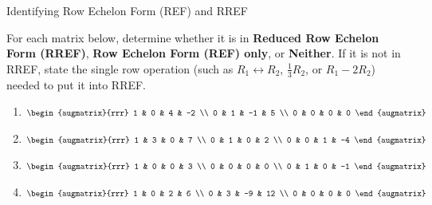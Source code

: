 \documentclass{article}
\begin{document}
\vspace{6pt}
\begin{activity} Identifying Row Echelon Form (REF) and RREF

For each matrix below, determine whether it is in \textbf{Reduced Row Echelon Form (RREF)}, \textbf{Row Echelon Form (REF) only}, or \textbf{Neither}. If it is not in RREF, state the single row operation (such as \(R_1 \leftrightarrow R_2\), \(\frac{1}{3}R_2\), or \(R_1 - 2R_2\)) needed to put it into RREF.
\begin{enumerate}
  \item \(\begin{augmatrix}{rrr}
    1 & 0 & 4 & -2 \\
    0 & 1 & -1 & 5 \\
    0 & 0 & 0 & 0
  \end{augmatrix}\)
  \item \(\begin{augmatrix}{rrr}
    1 & 3 & 0 & 7 \\
    0 & 1 & 0 & 2 \\
    0 & 0 & 1 & -4
  \end{augmatrix}\)
  \item \(\begin{augmatrix}{rrr}
    1 & 0 & 0 & 3 \\
    0 & 0 & 0 & 0 \\
    0 & 1 & 0 & -1
  \end{augmatrix}\)
  \item \(\begin{augmatrix}{rrr}
    1 & 0 & 2 & 6 \\
    0 & 3 & -9 & 12 \\
    0 & 0 & 0 & 0
  \end{augmatrix}\)
\end{enumerate}
\end{activity}
\end{document}
